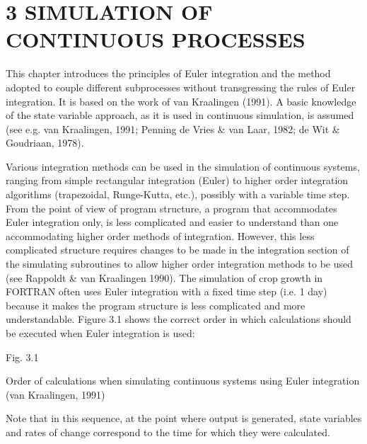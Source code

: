 \documentclass[11pt]{article}
\newcommand{\FigDir}{.}
\begin{document}
\setcounter{page}{19}\pagenumpos{\pnbr}
\section{  3 SIMULATION OF CONTINUOUS PROCESSES  }

\bigskip
\bigskip
This chapter introduces the principles of Euler integration and the method adopted to
couple different subprocesses without transgressing the rules of Euler integration. It is
based on the work of van Kraalingen (1991). A basic knowledge of the state variable
approach, as it is used in continuous simula\-tion, is assumed (see e.g. van Kraalingen,
1991; Penning de Vries \& van Laar, 1982; de Wit \& Goudriaan, 1978).

\bigskip
Various integration methods can be used in the simulation of continuous systems, ranging
from simple rectangular integration (Euler) to higher order integration algorithms (trap\-ezoidal, Runge-Kutta, etc.), possibly with a variable time step. From the point of view of
program structure, a program that accommodates Euler integra\-tion only, is less compli\-cated and easier to understand than one accommodating higher order methods of integra\-tion. However, this less complicated structure requires changes to be made in the
integration section of the simulating subroutines to allow higher order integration methods
to be used (see Rappoldt \& van Kraalin\-gen 1990). The simulation of crop growth in
FORTRAN often uses Euler integration with a fixed time step (i.e. 1 day) because it
makes the program structure is less complicated and more understandable. Figure 3.1
shows the correct order in which calculations should be executed when Euler integration
is used:

\begin{figure}[htbp]
 \begin{center}\epsfig{file=\FigDir/FSE0.eps,width=9.33cm} \end{center}
\end{figure}

\bigskip
\bigskip
\bigskip
\bigskip
\bigskip
\bigskip
\bigskip
\bigskip
\bigskip
\bigskip
\bigskip
\bigskip
\bigskip
\bigskip
Fig. 3.1
\testlastline

\begin{indenting}{2.54cm}
Order of calcu\-lations when simulat\-ing con\-tinuous systems using Euler inte\-gra\-tion (van Kraalingen, 1991)
\end{indenting}

 \bigskip
Note that in this sequence, at the point where output is generated, state variables and rates
of change correspond to the time for which they were calculated. 
\end{document}
